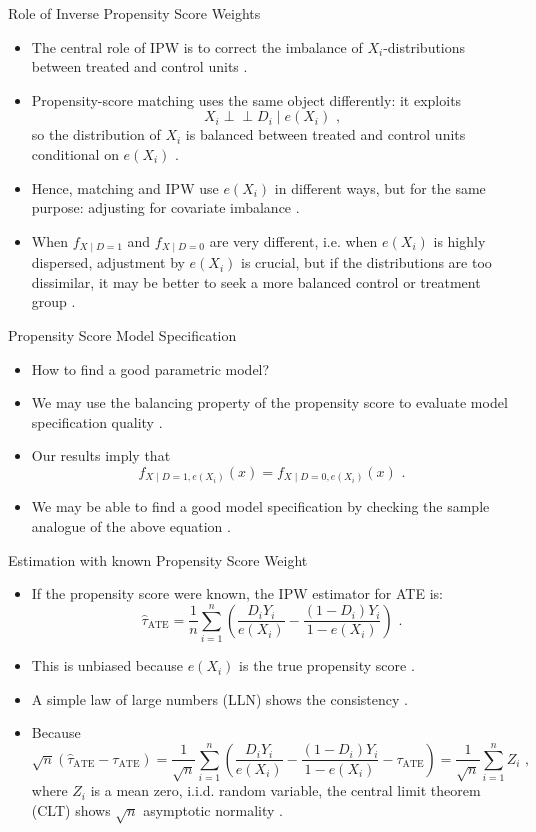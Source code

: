 \documentclass[11pt,aspectratio=169]{beamer}
\begin{document}
\begin{frame}{Role of Inverse Propensity Score Weights}
\begin{itemize}
    \item The central role of IPW is to correct the imbalance of $X_i$-distributions between treated and control units .
    \item Propensity-score matching uses the same object differently: it exploits
    $$X_i \perp\!\!\!\perp D_i \mid e(X_i) \text{ ,}$$
    so the distribution of $X_i$ is balanced between treated and control units conditional on $e(X_i)$ .
    \item Hence, matching and IPW use $e(X_i)$ in different ways, but for the same purpose: adjusting for covariate imbalance .
    \item When $f_{X \mid D=1}$ and $f_{X \mid D=0}$ are very different, i.e. when $e(X_i)$ is highly dispersed, adjustment by $e(X_i)$ is crucial, but if the distributions are too dissimilar, it may be better to seek a more balanced control or treatment group .
\end{itemize}
\end{frame}


\begin{frame}{Propensity Score Model Specification}

\begin{itemize}
    \item How to find a good parametric model? 
    \item We may use the balancing property of the propensity score to evaluate model specification quality .
    \item Our results imply that
    $$f_{X \mid D=1, e(X_i)}(x) = f_{X \mid D=0, e(X_i)}(x) \text{ .}$$
    \item We may be able to find a good model specification by checking the sample analogue of the above equation .
\end{itemize}
\end{frame}

\begin{frame}{Estimation with known Propensity Score Weight}
\begin{itemize}
    \item If the propensity score were known, the IPW estimator for ATE is:
    $$\widehat{\tau}_{\text{ATE}} = \frac{1}{n} \sum_{i=1}^n \left(\frac{D_i Y_i}{e(X_i)} - \frac{(1 - D_i)Y_i}{1 - e(X_i)}\right) \text{ .}$$
    \item This is unbiased because $e(X_i)$ is the true propensity score .
    \item A simple law of large numbers (LLN) shows the consistency .
    \item Because
    $$\sqrt{n}(\widehat{\tau}_{\text{ATE}} - \tau_{\text{ATE}}) = \frac{1}{\sqrt{n}} \sum_{i=1}^n \left(\frac{D_i Y_i}{e(X_i)} - \frac{(1 - D_i)Y_i}{1 - e(X_i)} - \tau_{\text{ATE}}\right) = \frac{1}{\sqrt{n}} \sum_{i=1}^n Z_i \text{ ,}$$
    where $Z_i$ is a mean zero, i.i.d. random variable, the central limit theorem (CLT) shows $\sqrt{n}$ asymptotic normality .
\end{itemize}
\end{frame}
\end{document}
